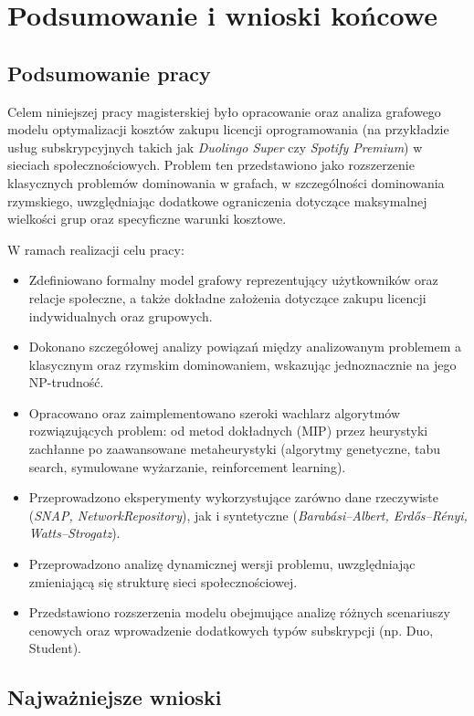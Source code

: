 \chapter{Podsumowanie i wnioski końcowe}

\section{Podsumowanie pracy}

Celem niniejszej pracy magisterskiej było opracowanie oraz analiza grafowego modelu optymalizacji kosztów zakupu licencji oprogramowania (na przykładzie usług subskrypcyjnych takich jak \textit{Duolingo Super} czy \textit{Spotify Premium}) w sieciach społecznościowych. Problem ten przedstawiono jako rozszerzenie klasycznych problemów dominowania w grafach, w szczególności dominowania rzymskiego, uwzględniając dodatkowe ograniczenia dotyczące maksymalnej wielkości grup oraz specyficzne warunki kosztowe.

W ramach realizacji celu pracy:

\begin{itemize}
    \item Zdefiniowano formalny model grafowy reprezentujący użytkowników oraz relacje społeczne, a także dokładne założenia dotyczące zakupu licencji indywidualnych oraz grupowych.
    \item Dokonano szczegółowej analizy powiązań między analizowanym problemem a klasycznym oraz rzymskim dominowaniem, wskazując jednoznacznie na jego NP-trudność.
    \item Opracowano oraz zaimplementowano szeroki wachlarz algorytmów rozwiązujących problem: od metod dokładnych (MIP) przez heurystyki zachłanne po zaawansowane metaheurystyki (algorytmy genetyczne, tabu search, symulowane wyżarzanie, reinforcement learning).
    \item Przeprowadzono eksperymenty wykorzystujące zarówno dane rzeczywiste (\textit{SNAP, NetworkRepository}), jak i syntetyczne (\textit{Barabási–Albert, Erdős–Rényi, Watts–Strogatz}).
    \item Przeprowadzono analizę dynamicznej wersji problemu, uwzględniając zmieniającą się strukturę sieci społecznościowej.
    \item Przedstawiono rozszerzenia modelu obejmujące analizę różnych scenariuszy cenowych oraz wprowadzenie dodatkowych typów subskrypcji (np. Duo, Student).
\end{itemize}

\section{Najważniejsze wnioski}

